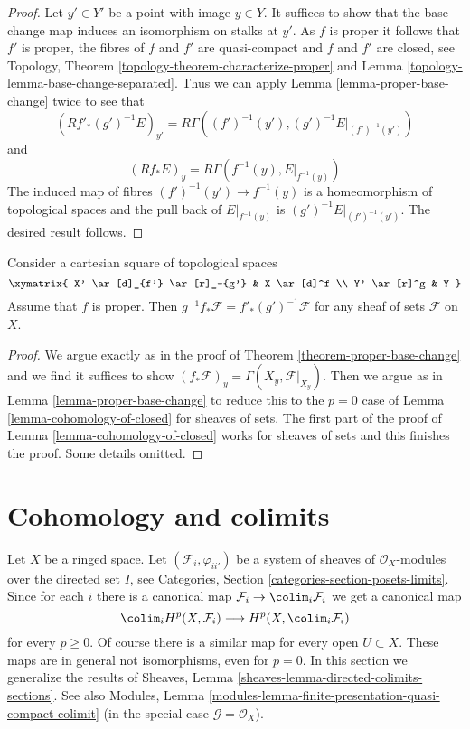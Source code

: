 \begin{proof}
Let $y' \in Y'$ be a point with image $y \in Y$. It suffices to show that
the base change map induces an isomorphism on stalks at $y'$.
As $f$ is proper it follows that $f'$ is proper, the
fibres of $f$ and $f'$ are quasi-compact and $f$ and $f'$ are closed, see
Topology, Theorem \ref{topology-theorem-characterize-proper} and
Lemma \ref{topology-lemma-base-change-separated}.
Thus we can apply Lemma \ref{lemma-proper-base-change} twice to see that
$$
(Rf'_*(g')^{-1}E)_{y'} = R\Gamma((f')^{-1}(y'), (g')^{-1}E|_{(f')^{-1}(y')})
$$
and
$$
(Rf_*E)_y = R\Gamma(f^{-1}(y), E|_{f^{-1}(y)})
$$
The induced map of fibres $(f')^{-1}(y') \to f^{-1}(y)$ is
a homeomorphism of topological spaces and the pull back of
$E|_{f^{-1}(y)}$ is $(g')^{-1}E|_{(f')^{-1}(y')}$. The
desired result follows.
\end{proof}

\begin{lemma}
\label{lemma-proper-base-change-sheaves-of-sets}
Consider a cartesian square of topological spaces
$$
\xymatrix{
X' \ar[d]_{f'} \ar[r]_-{g'} & X \ar[d]^f \\
Y' \ar[r]^g & Y
}
$$
Assume that $f$ is proper. Then
$g^{-1}f_*\mathcal{F} = f'_*(g')^{-1}\mathcal{F}$
for any sheaf of sets $\mathcal{F}$ on $X$.
\end{lemma}

\begin{proof}
We argue exactly as in the proof of Theorem \ref{theorem-proper-base-change}
and we find it suffices to show
$(f_*\mathcal{F})_y = \Gamma(X_y, \mathcal{F}|_{X_y})$.
Then we argue as in Lemma \ref{lemma-proper-base-change}
to reduce this to the $p = 0$ case of Lemma \ref{lemma-cohomology-of-closed}
for sheaves of sets. The first part of the proof of
Lemma \ref{lemma-cohomology-of-closed}
works for sheaves of sets and this finishes the proof.
Some details omitted.
\end{proof}



\section{Cohomology and colimits}
\label{section-limits}

\noindent
Let $X$ be a ringed space. Let $(\mathcal{F}_i, \varphi_{ii'})$ be
a system of sheaves of $\mathcal{O}_X$-modules over the directed set $I$, see
Categories, Section \ref{categories-section-posets-limits}.
Since for each $i$ there is a canonical map
$\mathcal{F}_i \to \colim_i \mathcal{F}_i$ we get a
canonical map
$$
\colim_i H^p(X, \mathcal{F}_i)
\longrightarrow
H^p(X, \colim_i \mathcal{F}_i)
$$
for every $p \geq 0$. Of course there is a similar map for
every open $U \subset X$. These maps are in general not isomorphisms,
even for $p = 0$. In this section we generalize the results of
Sheaves, Lemma \ref{sheaves-lemma-directed-colimits-sections}.
See also
Modules, Lemma \ref{modules-lemma-finite-presentation-quasi-compact-colimit}
(in the special case $\mathcal{G} = \mathcal{O}_X$).

